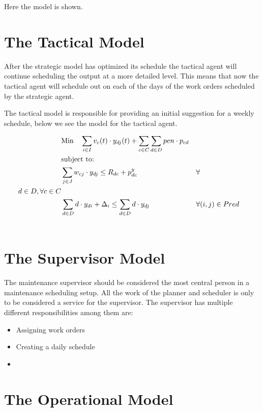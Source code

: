 Here the model is shown. 

\section{The Tactical Model}
After the strategic model has optimized its schedule the tactical agent will continue scheduling the output at a more detailed level. This means that now the tactical agent will schedule 
out on each of the days of the work orders scheduled by the strategic agent. 

The tactical model is responsible for providing an initial suggestion for a weekly schedule, below we see the model for the tactical agent.


\begin{align}
	& \text{Min} \quad \sum_{i \in I} v_{c}(t) \cdot y_{dj}(t) + \sum_{c \in C} \sum_{d \in D} pen \cdot p_{cd}\\  
	& \text{subject to:} \notag \\
	& \sum_{j \in J} w_{cj} \cdot y_{dj} \leq R_{dc} + p^y_{dc} && \forall \\ d \in D, \forall c \in C \\ 
	& \sum_{d \in D} d \cdot y_{di} + \Delta_i \leq \sum_{d \in D} d \cdot y_{dj} && \forall (i, j) \in Pred \\ 
	& 
\end{align}




\section{The Supervisor Model}
The maintenance supervisor should be considered the most central person in a maintenance scheduling setup. All the work of the planner and scheduler is only to be considered a service for the supervisor.
The supervisor has multiple different responsibilities among them are: 

\begin{itemize}
	\item Assigning work orders
	\item Creating a daily schedule
	\item 
\end{itemize}


\section{The Operational Model}



